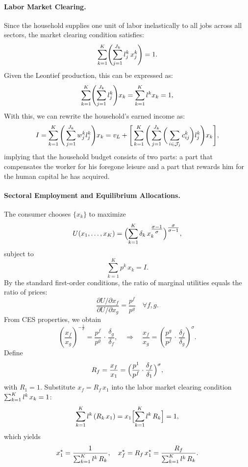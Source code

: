 \documentclass{article}
\theoremstyle{plain}
\theoremstyle{plain}
\begin{document}
\paragraph{Labor Market Clearing.}  
Since the household supplies one unit of labor inelastically to all jobs across all sectors, the market clearing condition satisfies:  
\[
\sum_{k=1}^K \Biggl( \sum_{j=1}^{J_k} l_{j}^k\,x_j^k \Biggr) = 1.
\]  
Given the Leontief production, this can be expressed as:  
\[
\sum_{k=1}^K \Biggl( \sum_{j=1}^{J_k} l_{j}^k \Biggr) x_k = \sum_{k=1}^K l_{}^k x_k = 1,
\]  
With this, we can rewrite the household's earned income as:  
\[
I = \sum_{k=1}^{K} \Bigg( \sum_{j=1}^{J_k} w_j^k l_{j}^k \Bigg) x_k 
= v_L + \Bigg[ \sum_{k=1}^{K} \Bigg( \sum_{j=1}^{J_k} \bigg( \sum_{i \in \mathcal{J}_j} c_{ij}^k \bigg) l_{j}^k \Bigg) x_k \Bigg],
\]  
implying that the household budget consists of two parts: a part that compensates the worker for his foregone leisure and a part that rewards him for the human capital he has acquired.


\paragraph{Sectoral Employment and Equilibrium Allocations.}
The consumer chooses $\{x_k\}$ to maximize
\[
U(x_1,\dots,x_K) = \Bigl(\sum_{k=1}^K \delta_k \,x_k^{\tfrac{\sigma-1}{\sigma}}\Bigr)^{\tfrac{\sigma}{\sigma-1}},
\]
subject to
\[
\sum_{k=1}^K p^k\, x_k = I.
\]
By the standard first-order conditions, the ratio of marginal utilities equals the ratio of prices:
\[
\frac{\partial U/\partial x_f}{\partial U/\partial x_g} = \frac{p^f}{p^g} \quad \forall f,g.
\]
From CES properties, we obtain
\[
\left(\frac{x_f}{x_g}\right)^{-\tfrac{1}{\sigma}} = \frac{p^f}{p^g}\,\cdot\,\frac{\delta_g}{\delta_f},
\quad
\Longrightarrow
\quad
\frac{x_f}{x_g} = \left(\frac{p^g}{p^f}\,\cdot\,\frac{\delta_f}{\delta_g}\right)^{\sigma}.
\]
Define
\[
R_f = \frac{x_f}{x_1} = \Bigl(\frac{p^1}{p^f} \cdot \frac{\delta_f}{\delta_1}\Bigr)^{\sigma},
\]
with $R_1 = 1$.
Substitute $x_f = R_f\,x_1$ into the labor market clearing condition $\sum_{k=1}^K l_{}^k\, x_k = 1$:
\[
\sum_{k=1}^K l_{}^k\,(R_k\,x_1) = x_1\Bigl[\sum_{k=1}^K l_{}^k\,R_k\Bigr] = 1,
\]
which yields
\[
x_1^* = \frac{1}{\sum_{k=1}^K l_{}^k\,R_k},
\quad
x_f^* = R_f\,x_1^* = \frac{R_f}{\sum_{k=1}^K l_{}^k\,R_k}.
\]
\end{document}
